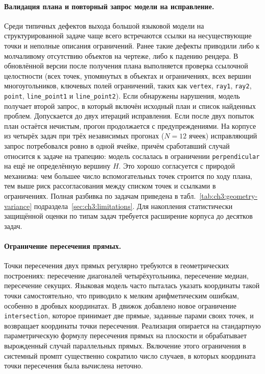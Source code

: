\paragraph{Валидация плана и повторный запрос модели на исправление.} Среди типичных дефектов выхода большой языковой модели на структурированной задаче чаще всего встречаются ссылки на несуществующие точки и неполные описания ограничений. Ранее такие дефекты приводили либо к молчаливому отсутствию объектов на чертеже, либо к падению рендера. В обновлённой версии после получения плана выполняется проверка ссылочной целостности (всех точек, упомянутых в объектах и ограничениях, всех вершин многоугольников, ключевых полей ограничений, таких как \texttt{vertex}, \texttt{ray1}, \texttt{ray2}, \texttt{point}, \texttt{line\_point1} и \texttt{line\_point2}). Если обнаружены нарушения, модель получает второй запрос, в который включён исходный план и список найденных проблем. Допускается до двух итераций исправления. Если после двух попыток план остаётся нечистым, прогон продолжается с предупреждениями. На корпусе из четырёх задач при трёх независимых прогонах (\(N = 12\) ячеек) исправляющий запрос потребовался ровно в одной ячейке, причём сработавший случай относится к задаче на трапецию: модель сослалась в ограничении \texttt{perpendicular} на ещё не определённую вершину \(H\). Это хорошо согласуется с природой механизма: чем большее число вспомогательных точек строится по ходу плана, тем выше риск рассогласования между списком точек и ссылками в ограничениях. Полная разбивка по задачам приведена в табл.~\ref{tab:ch3:geometry-variance} подраздела~\ref{sec:ch3:limitations}. Для накопления статистически защищённой оценки по типам задач требуется расширение корпуса до десятков задач.

\paragraph{Ограничение пересечения прямых.} Точки пересечения двух прямых регулярно требуются в геометрических построениях: пересечение диагоналей четырёхугольника, пересечение медиан, пересечение секущих. Языковая модель часто пыталась указать координаты такой точки самостоятельно, что приводило к мелким арифметическим ошибкам, особенно в дробных координатах. В движок добавлено новое ограничение \texttt{intersection}, которое принимает две прямые, заданные парами своих точек, и возвращает координаты точки пересечения. Реализация опирается на стандартную параметрическую формулу пересечения прямых на плоскости и обрабатывает вырожденный случай параллельных прямых. Включение этого ограничения в системный промпт существенно сократило число случаев, в которых координата точки пересечения была вычислена неточно.

